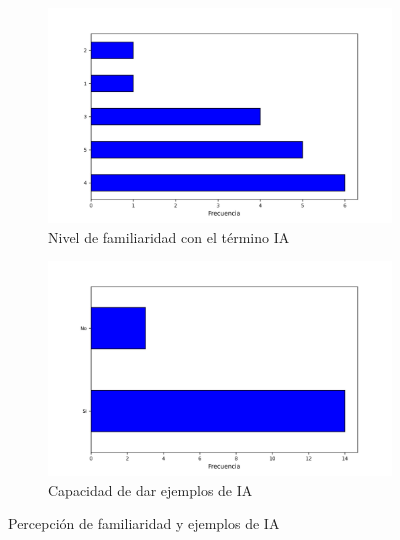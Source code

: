 \documentclass[12pt,a4paper]{article}
\begin{document}
\begin{figure}[h!]
    \centering
    \begin{subfigure}{0.45\linewidth}
        \centering
        \includegraphics[width=\linewidth]{3_Del 1 al 5, Qué tan familiarizado está con el término Inteligencia Artificial.jpg}
        \caption{Nivel de familiaridad con el término IA}
        \label{fig:f3}
    \end{subfigure}
    \hfill
    \begin{subfigure}{0.45\linewidth}
        \centering
        \includegraphics[width=\linewidth]{4_Puede nombrar algunos ejemplos de IA que encuentre en su vida diaria.jpg}
        \caption{Capacidad de dar ejemplos de IA}
        \label{fig:f4}
    \end{subfigure}
    \caption{Percepción de familiaridad y ejemplos de IA}
\end{figure}
\end{document}
